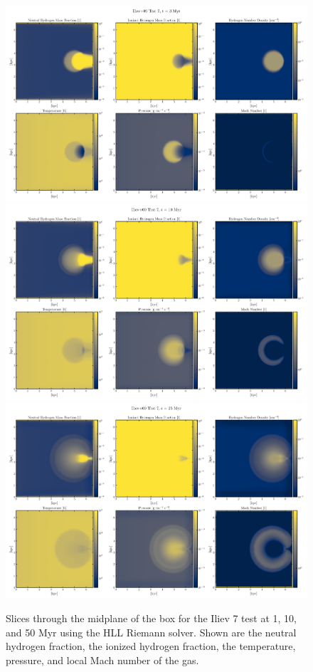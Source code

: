 \begin{figure}
\centering
\includegraphics[width=.75\textwidth]{figures/RHD/Iliev7/output_0003-HLL.png}\\
\includegraphics[width=.75\textwidth]{figures/RHD/Iliev7/output_0010-HLL.png}\\
\includegraphics[width=.75\textwidth]{figures/RHD/Iliev7/output_0025-HLL.png}
\caption{
Slices through the midplane of the box for the Iliev 7 test at 1, 10, and 50 Myr using the HLL
Riemann solver. Shown are the neutral hydrogen fraction, the ionized hydrogen fraction, the
temperature, pressure, and local Mach number of the gas.
}
\label{fig:iliev7-slices-HLL}
\end{figure}




